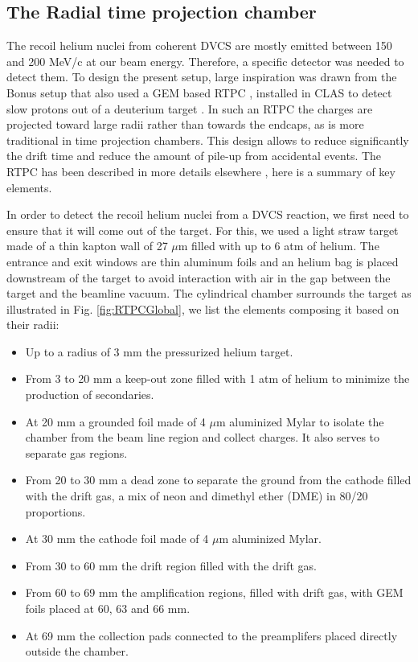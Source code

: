 \documentclass[aps,prc,preprint,superscriptaddress]{revtex4}
\begin{document}
\subsection{The Radial time projection chamber}

The recoil helium nuclei from coherent DVCS are mostly emitted between 150 
and 200 MeV/c at our beam energy. Therefore, a specific detector was 
needed to detect them. To design the present setup, large inspiration was drawn from the 
Bonus setup that also used a GEM based RTPC \cite{Fenker:2008zz}, installed in CLAS to 
detect slow protons out of a deuterium target \cite{Baillie:2011za}. In such an RTPC the 
charges are projected toward large radii 
rather than towards the endcaps, as is more traditional in time 
projection chambers. This design allows to reduce significantly the drift time and reduce the 
amount of pile-up from accidental events. The RTPC has been described in more 
details elsewhere \cite{Dupre:2017upj}, here is a summary of key elements.

In order to detect the recoil helium nuclei from a DVCS reaction, we first need 
to ensure that it will come out of the target. For this, we used a light straw 
target made of a thin kapton wall of 27 $\mu$m filled with up to 6 atm of 
helium. The entrance and exit windows are thin aluminum foils and an helium 
bag is placed downstream of the target to avoid interaction with air in the gap 
between the target and the beamline vacuum. The cylindrical 
chamber surrounds the target as illustrated in Fig. \ref{fig:RTPCGlobal}, we 
list the elements composing it based on their radii:
\begin{itemize}
	\item Up to a radius of 3 mm the pressurized helium target.
	\item From 3 to 20 mm a keep-out zone filled with 1 atm of helium to 
		minimize the production of secondaries. 
	\item At 20 mm a grounded foil made of 4 $\mu$m aluminized Mylar to 
		isolate the chamber from the beam line 
		region and collect charges. It also serves to separate gas regions.
	\item From 20 to 30 mm a dead zone to separate the ground from the cathode
		filled with the drift gas, a mix of neon and dimethyl ether (DME) in 
		80/20 proportions.
	\item At 30 mm the cathode foil made of 4 $\mu$m aluminized Mylar.
	\item From 30 to 60 mm the drift region filled with the drift gas.
	\item From 60 to 69 mm the amplification regions, filled with drift gas, 
		with GEM foils placed at 60, 63 and 66 mm.
	\item At 69 mm the collection pads connected to the preamplifers placed 
		directly outside the chamber.
\end{itemize}
\end{document}
